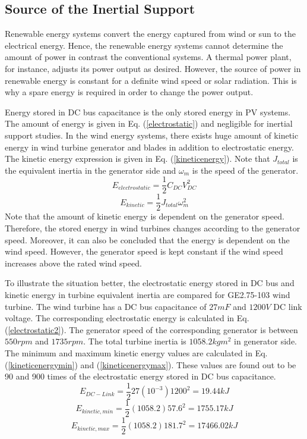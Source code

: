 \subsection{Source of the Inertial Support}
Renewable energy systems convert the energy captured from wind or sun to the electrical energy. Hence, the renewable energy systems cannot determine the amount of power in contrast the conventional systems. A thermal power plant, for instance, adjusts its power output as desired. However, the source of power in renewable energy is constant for a definite wind speed or solar radiation. This is why a spare energy is required in order to change the power output. \par
Energy stored in DC bus capacitance is the only stored energy in PV systems. The amount of energy is given in Eq. (\ref{electrostatic}) and negligible for inertial support studies. In the wind energy systems, there exists huge amount of kinetic energy in wind turbine generator and blades in addition to electrostatic energy. The kinetic energy expression is given in Eq. (\ref{kineticenergy}). Note that $J_{total}$ is the equivalent inertia in the generator side and $\omega_{m}$ is the speed of the generator.
\begin{equation}
E_{electrostatic}=\frac{1}{2} C_{DC}V_{DC}^{2}
\label{electrostatic}
\end{equation}
\begin{equation}
E_{kinetic}=\frac{1}{2} J_{total}\omega_{m}^{2}
\label{kineticenergy}
\end{equation}
Note that the amount of kinetic energy is dependent on the generator speed. Therefore, the stored energy in wind turbines changes according to the generator speed. Moreover, it can also be concluded that the energy is dependent on the wind speed. However, the generator speed is kept constant if the wind speed increases above the rated wind speed. \par
To illustrate the situation better, the electrostatic energy stored in DC bus and kinetic energy in turbine equivalent inertia are compared for GE2.75-103 wind turbine. The wind turbine has a DC bus capacitance of $27mF$ and $1200V$ DC link voltage. The corresponding electrostatic energy is calculated in Eq. (\ref{electrostatic2}). The generator speed of the corresponding generator is between $550rpm$ and $1735rpm$. The total turbine inertia is $1058.2 kgm^2$ in generator side. The minimum and maximum kinetic energy values are calculated in Eq. (\ref{kineticenergymin}) and (\ref{kineticenergymax}). These values are found out to be 90 and 900 times of the electrostatic energy stored in DC bus capacitance.
\begin{equation}
E_{DC-Link}=\frac{1}{2} 27 (10^{-3}) 1200^{2}=19.44kJ
\label{electrostatic2}
\end{equation}
\begin{equation}
E_{kinetic,min}=\frac{1}{2} (1058.2) 57.6^{2}=1755.17kJ
\label{kineticenergymin}
\end{equation}
\begin{equation}
E_{kinetic,max}=\frac{1}{2} (1058.2) 181.7^{2}=17466.02kJ
\label{kineticenergymax}
\end{equation}
